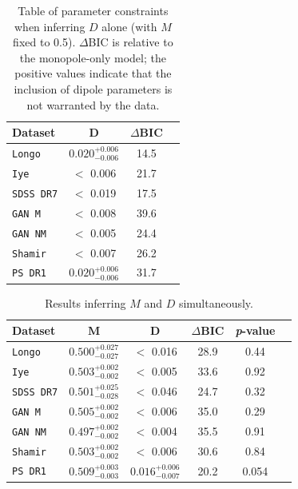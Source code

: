 \documentclass[fleqn,usenatbib,nofootinbib]{mnras}
\begin{document}
\begin{table}
\centering
\caption{Table of parameter constraints when inferring $D$ alone (with $M$ fixed to 0.5). $\Delta$BIC is relative to the monopole-only model; the positive values indicate that the inclusion of dipole parameters is not warranted by the data.}
\label{tab:D}
\renewcommand{\arraystretch}{1.5} %
\begin{tabular}{|l|c|c|c|}
\hline
\textbf{Dataset} & $\mathbf{D}$ & \textbf{$\Delta$BIC} \\
\hline
\texttt{Longo} & $0.020^{+0.006}_{-0.006}$ & 14.5 \\
\texttt{Iye} & $<$ 0.006 & 21.7 \\
\texttt{SDSS DR7} & $<$ 0.019 & 17.5 \\
\texttt{GAN M} & $<$ 0.008 & 39.6 \\
\texttt{GAN NM} & $<$ 0.005 & 24.4 \\
\texttt{Shamir} & $<$ 0.007 & 26.2 \\
\texttt{PS DR1} & $0.020^{+0.006}_{-0.006}$ & 31.7 \\
\hline
\end{tabular}
\end{table}


\begin{table}
\centering
\caption{Results inferring $M$ and $D$ simultaneously.}
\label{tab:long}
\renewcommand{\arraystretch}{1.5} %
\begin{tabular}{|l|c|c|c|c|c|}
\hline
\textbf{Dataset} & $\mathbf{M}$ & $\mathbf{D}$ & \textbf{$\Delta$BIC} & \textbf{\textit{p}-value} \\
\hline
\texttt{Longo} & $0.500^{+0.027}_{-0.027}$ & $<$ 0.016 & 28.9 & 0.44 \\
\texttt{Iye} & $0.503^{+0.002}_{-0.002}$ & $<$ 0.005 & 33.6 & 0.92 \\
\texttt{SDSS DR7} & $0.501^{+0.025}_{-0.028}$ & $<$ 0.046 & 24.7 & 0.32 \\
\texttt{GAN M} & $0.505^{+0.002}_{-0.002}$ & $<$ 0.006 & 35.0 & 0.29 \\
\texttt{GAN NM} & $0.497^{+0.002}_{-0.002}$ & $<$ 0.004 & 35.5 & 0.91 \\
\texttt{Shamir} & $0.503^{+0.002}_{-0.002}$ & $<$ 0.006 & 30.6 & 0.84 \\
\texttt{PS DR1} & $0.509^{+0.003}_{-0.003}$ & $0.016^{+0.006}_{-0.007}$ & 20.2 & 0.054 \\
\hline
\end{tabular}
\end{table}
\end{document}
